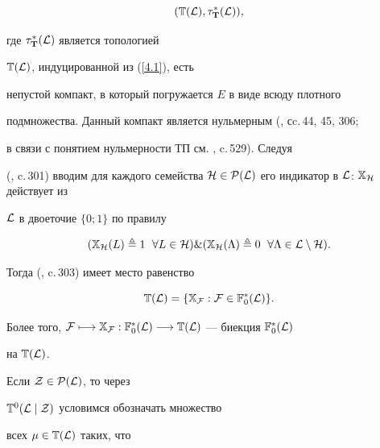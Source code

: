 {\begin{equation}\label{4.2}


({\Bbb T}({\cal L}),{{\tau}_{\bold T}^*}({\cal L})),


\end{equation}


где ${{\tau}_{\bold T}^*}({\cal L})$ является топологией


${\Bbb T}({\cal L})$, индуцированной из (\ref{4.1}), есть


непустой компакт, в который погружается $E$ в виде всюду плотного


подмножества. Данный компакт является нульмерным (\cite{6}, сc.\,44, 45, 306;


в связи с понятием нульмерности ТП см. \cite{4}, c.\,529). Следуя


(\cite{6}, c.\,301) вводим для каждого семейства ${\cal H} \in {{\cal P}({\cal


L})}$ его индикатор в ${\cal L}$: ${{\Bbb X}_{\cal H}}$ действует из


${\cal L}$ в двоеточие $\{0;1\}$ по правилу


$$


({{\Bbb X}_{\cal H}}(L) \triangleq 1\ \; \fo{L} \in {\cal H}) \&


({{\Bbb X}_{\cal H}}(\Ld) \triangleq 0\ \; \fo{\Ld} \in {\cal L}\setminus{\cal


H}).


$$


Тогда (\cite{6}, c.\,303) имеет место равенство


\begin{equation}\label{4.3}


{{\Bbb T}({\cal L})} = \{{{\Bbb X}_{\cal F}}:


{\cal F} \in {{\Bbb F}_0^*}({\cal L})\}.


\end{equation}


Более того, ${\cal F} \longmapsto {{\Bbb X}_{\cal F}}:{{\Bbb F}_0^*}({\cal


L}) \lo {{\Bbb T}({\cal L})}$ --- биекция ${{\Bbb F}_0^*}({\cal L})$


на ${\Bbb T}({\cal L})$.





Если ${\cal Z} \in {\cal P}({\cal L})$, то через


${{\Bbb T}^0}({\cal L}\mid{\cal Z})$ условимся обозначать множество


всех $\mu \in {\Bbb T}({\cal L})$ таких, что


}
